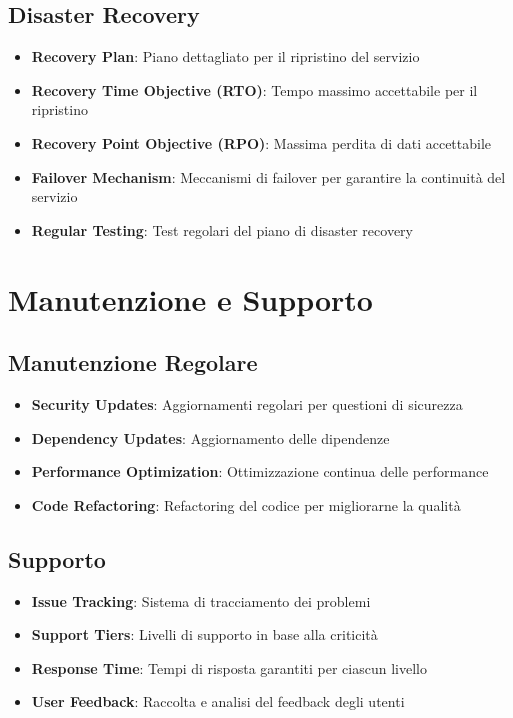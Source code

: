 \subsection{Disaster Recovery}
\begin{itemize}
    \item \textbf{Recovery Plan}: Piano dettagliato per il ripristino del servizio
    \item \textbf{Recovery Time Objective (RTO)}: Tempo massimo accettabile per il ripristino
    \item \textbf{Recovery Point Objective (RPO)}: Massima perdita di dati accettabile
    \item \textbf{Failover Mechanism}: Meccanismi di failover per garantire la continuità del servizio
    \item \textbf{Regular Testing}: Test regolari del piano di disaster recovery
\end{itemize}

\section{Manutenzione e Supporto}

\subsection{Manutenzione Regolare}
\begin{itemize}
    \item \textbf{Security Updates}: Aggiornamenti regolari per questioni di sicurezza
    \item \textbf{Dependency Updates}: Aggiornamento delle dipendenze
    \item \textbf{Performance Optimization}: Ottimizzazione continua delle performance
    \item \textbf{Code Refactoring}: Refactoring del codice per migliorarne la qualità
\end{itemize}

\subsection{Supporto}
\begin{itemize}
    \item \textbf{Issue Tracking}: Sistema di tracciamento dei problemi
    \item \textbf{Support Tiers}: Livelli di supporto in base alla criticità
    \item \textbf{Response Time}: Tempi di risposta garantiti per ciascun livello
    \item \textbf{User Feedback}: Raccolta e analisi del feedback degli utenti
\end{itemize}